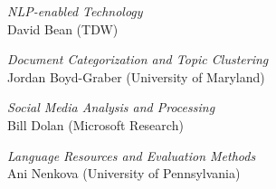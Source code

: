 \emph{NLP-enabled Technology} \\
David Bean (TDW) \\

\emph{Document Categorization and Topic Clustering} \\
Jordan Boyd-Graber (University of Maryland) \\

\emph{Social Media Analysis and Processing} \\
Bill Dolan (Microsoft Research) \\

\emph{Language Resources and Evaluation Methods} \\
Ani Nenkova (University of Pennsylvania)



